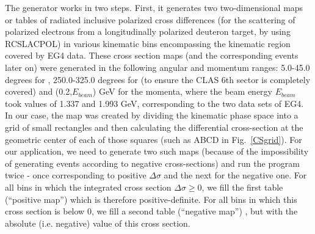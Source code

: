 The generator works in two steps. First, it generates two two-dimensional maps or tables of radiated inclusive polarized cross differences %
(for the scattering of polarized electrons from a longitudinally polarized deuteron target, by using RCSLACPOL) in various kinematic bins encompassing the kinematic region covered by EG4 data. 
These cross section maps (and the corresponding events later on) were generated in the following angular and momentum ranges: 5.0-45.0 degrees for \th, 250.0-325.0 degrees for \ph (to ensure the CLAS 6th sector is completely covered) and (0.2,$E_{beam}$) GeV for the momenta, where the beam energy $E_{beam}$ took values of 1.337 and 1.993 GeV, corresponding to the two  data sets of EG4. 
In our case, the map was created by dividing the kinematic phase space into a grid of small rectangles %
and then calculating the differential cross-section at the geometric center of each of those squares (such as ABCD in Fig.~\ref{CSgrid}).
 For our application, we need to generate two such maps (because of the impossibility %
of generating events according to negative cross-sections) and run the program twice - once corresponding to positive %
$\Delta \sigma$ and the next for the negative one. For all bins in which the integrated cross section $\Delta \sigma \ge 0$, we fill the first table (``positive map'') which is therefore positive-definite. For all bins in which this cross section is below $0$, we fill a second table (``negative map'') , but with the absolute (i.e. negative) value of this cross section. %

